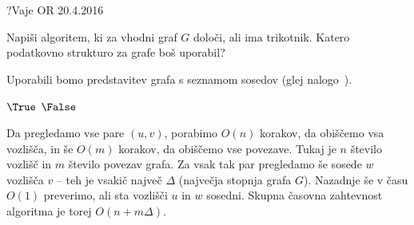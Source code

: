 \begin{naloga}{?}{Vaje OR 20.4.2016}
\begin{vprasanje}
Napiši algoritem, ki za vhodni graf $G$ določi, ali ima trikotnik.
Katero podatkovno strukturo za grafe boš uporabil?
\end{vprasanje}

\begin{odgovor}
Uporabili bomo predstavitev grafa s seznamom sosedov
(glej nalogo~\res[sosgraf]).
\begin{small}
\begin{algorithmic}
                    \State \Return $\True$
                \EndIf
            \EndFor
        \EndFor
    \EndFor
    \State \Return $\False$
\EndFunction
\end{algorithmic}
\end{small}
Da pregledamo vse pare $(u, v)$, porabimo $O(n)$ korakov,
da obiščemo vsa vozlišča,
in še $O(m)$ korakov, da obiščemo vse povezave.
Tukaj je $n$ število vozlišč in $m$ število povezav grafa.
Za vsak tak par pregledamo še sosede $w$ vozlišča $v$
-- teh je vsakič največ $\Delta$ (največja stopnja grafa $G$).
Nazadnje še v času $O(1)$ preverimo, ali sta vozlišči $u$ in $w$ sosedni.
Skupna časovna zahtevnost algoritma je torej $O(n + m\Delta)$.
\end{odgovor}
\end{naloga}
